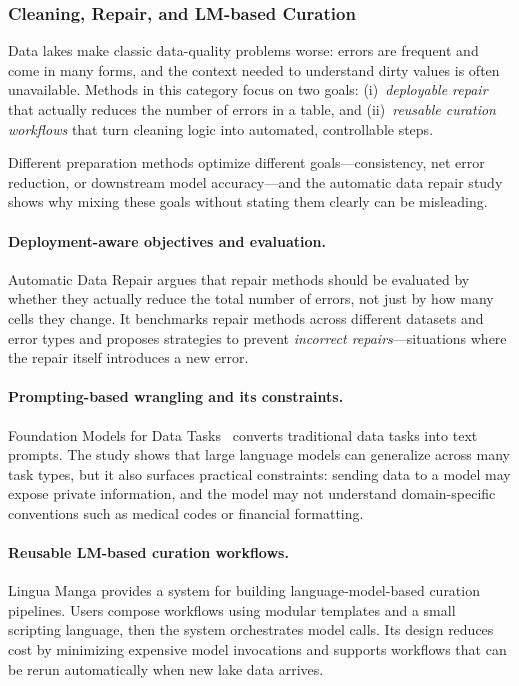 \documentclass[sigconf]{acmart}
\begin{document}
\subsubsection{Cleaning, Repair, and LM-based Curation}
Data lakes make classic data-quality problems worse: errors are frequent and come in many forms, and the context needed to understand dirty values is often unavailable. Methods in this category focus on two goals: (i)~\emph{deployable repair} that actually reduces the number of errors in a table, and (ii)~\emph{reusable curation workflows} that turn cleaning logic into automated, controllable steps.

Different preparation methods optimize different goals---consistency, net error reduction, or downstream model accuracy---and the automatic data repair study~\cite{10.14778/3675034.3675051} shows why mixing these goals without stating them clearly can be misleading.

\paragraph{Deployment-aware objectives and evaluation.}
Automatic Data Repair argues that repair methods should be evaluated by whether they actually reduce the total number of errors, not just by how many cells they change. It benchmarks repair methods across different datasets and error types and proposes strategies to prevent \emph{incorrect repairs}---situations where the repair itself introduces a new error.

\paragraph{Prompting-based wrangling and its constraints.}
Foundation Models for Data Tasks~\cite{10.14778/3574245.3574258} converts traditional data tasks into text prompts. The study shows that large language models can generalize across many task types, but it also surfaces practical constraints: sending data to a model may expose private information, and the model may not understand domain-specific conventions such as medical codes or financial formatting.

\paragraph{Reusable LM-based curation workflows.}
Lingua Manga provides a system for building language-model-based curation pipelines. Users compose workflows using modular templates and a small scripting language, then the system orchestrates model calls. Its design reduces cost by minimizing expensive model invocations and supports workflows that can be rerun automatically when new lake data arrives.
\end{document}
